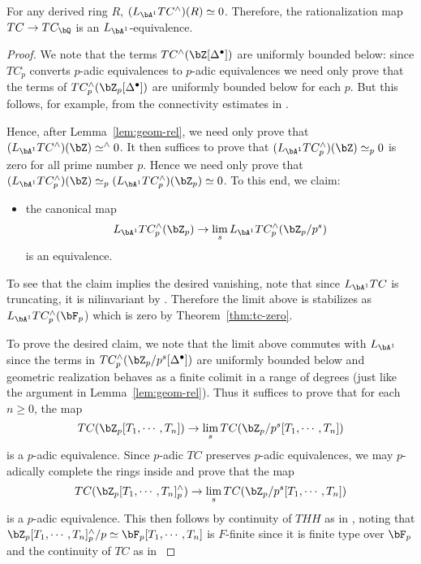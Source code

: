 \documentclass[a4paper,10pt]{amsart}
\begin{document}
\begin{thm} \label{thm:vanish} For any derived ring $R$, $(L_{\bA^1}TC^{\comp})(R) \simeq 0$. Therefore, the rationalization map $TC \rightarrow TC_{\bQ}$ is an $L_{\bA^1}$-equivalence.
\end{thm}
\begin{proof} We note that the terms $TC^{\comp}(\bZ[\Delta^{\bullet}])$ are uniformly bounded below: since $TC_p^\comp$ converts $p$-adic equivalences to $p$-adic equivalences we need only prove that the terms of $TC^{\comp}_p(\bZ_p[\Delta^{\bullet}])$ are uniformly bounded below for each $p$. But this follows, for example, from the connectivity estimates in \cite[Theorem 5.1(1)]{AMMN}.

Hence, after Lemma~\ref{lem:geom-rel}, we need only prove that $(L_{\bA^1}TC^{\comp})(\bZ) \simeq^{\comp} 0$. It then suffices to prove that $(L_{\bA^1}TC^{\comp}_p)(\bZ) \simeq_p 0$ is zero for all prime number $p$. Hence we need only prove that $(L_{\bA^1}TC^{\comp}_p)(\bZ) \simeq_p (L_{\bA^1}TC^{\comp}_p)(\bZ_p) \simeq 0$. To this end, we claim:
\begin{itemize}
\item the canonical map
\[
L_{\bA^1}TC^{\comp}_p(\bZ_p) \rightarrow \lim_s L_{\bA^1}TC^{\comp}_p(\bZ_p/p^s)
\]
is an equivalence.
\end{itemize}
To see that the claim implies the desired vanishing, note that since $L_{\bA^1}TC$ is truncating, it is nilinvariant by \cite[Corollary 3.5]{LT}. Therefore the limit above is stabilizes as $L_{\bA^1}TC^{\comp}_p(\bF_p$) which is zero by Theorem~\ref{thm:tc-zero}.

To prove the desired claim, we note that the limit above commutes with $L_{\bA^1}$ since the terms in $TC^{\comp}_p(\bZ_p/p^s[\Delta^{\bullet}])$ are uniformly bounded below and geometric realization behaves as a finite colimit in a range of degrees (just like the argument in Lemma~\ref{lem:geom-rel}). Thus it suffices to prove that for each $n \geq 0$, the map
\[
TC(\bZ_p[T_1, \cdots, T_n]) \rightarrow \lim_s TC(\bZ_p/p^s[T_1, \cdots, T_n]) 
\]
is a $p$-adic equivalence. Since $p$-adic $TC$ preserves $p$-adic equivalences, we may $p$-adically complete the rings inside and prove that the map
\[
TC(\bZ_p[T_1, \cdots, T_n]^{\comp}_p) \rightarrow  \lim_s TC(\bZ_p/p^s[T_1, \cdots, T_n])
\]
is a $p$-adic equivalence. This then follows by continuity of $THH$ as in \cite[Proposition 5.4]{CMM}, noting that $\bZ_p[T_1, \cdots, T_n]^{\comp}_p/p \simeq \bF_p[T_1, \cdots, T_n]$ is $F$-finite since it is finite type over $\bF_p$ and the continuity of $TC$ as in \cite[Remark 2.8]{CMM}


\end{proof}
\end{document}
